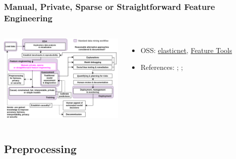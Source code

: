 \documentclass[11pt,
               aspectratio=169,
               hyperref={colorlinks}
               ]{beamer}
\begin{document}
			\begin{frame}
		
				\frametitle{Manual, Private, Sparse or Straightforward Feature Engineering }		
		
				\begin{columns}
	
					\centering
					\includegraphics[height=120pt]{../img/fe.png}
				
					\vspace{-5pt}
					\begin{itemize}
						\item OSS: \href{https://cran.r-project.org/web/packages/elasticnet/index.html}{elasticnet}, \href{https://index.pocketcluster.io/featuretools-featuretools.html}{Feature Tools}
						\item References: ; ; 
					\end{itemize}
				
				\end{columns}		
		
			\end{frame}
	
		\subsection{Preprocessing}
	
\end{document}

